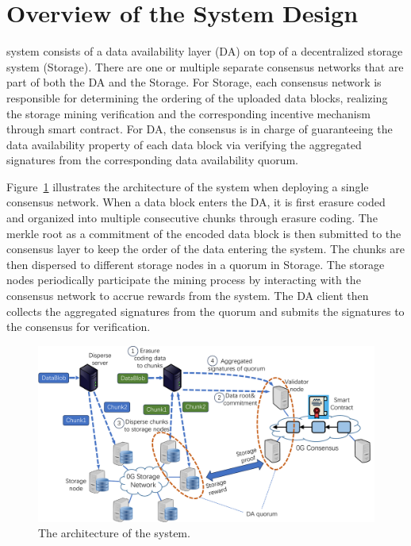 \section{Overview of the System Design}

\projabbrev system consists of a data availability layer (\projabbrev DA) on top of a decentralized storage system (\projabbrev Storage). 
There are one or multiple separate consensus networks that are part of both the \projabbrev DA and the \projabbrev Storage. 
For \projabbrev Storage, each consensus network is responsible for determining the ordering of the uploaded data blocks, realizing the storage mining verification and the corresponding incentive mechanism through smart contract. For \projabbrev DA, the consensus is in charge of guaranteeing the data availability property of each data block via verifying the aggregated signatures from the corresponding data availability quorum. 

Figure~\ref{fig:0gda} illustrates the architecture of the \projabbrev system when deploying a single consensus network. When a data block enters the \projabbrev DA, it is first erasure coded and organized into multiple consecutive chunks through erasure coding. The merkle root as a commitment of the encoded data block is then submitted to the consensus layer to keep the order of the data entering the system. The chunks are then dispersed to different storage nodes in a quorum in \projabbrev Storage. The storage nodes periodically participate the mining process by interacting with the consensus network to accrue rewards from the system. 
The DA client then collects the aggregated signatures from the quorum and submits the signatures to the consensus for verification.

\begin{figure}[H]	
	\includegraphics[width=\textwidth]{figure/0gda.pdf}
	\caption{The architecture of the \projabbrev system.}
	\label{fig:0gda}
\end{figure}

